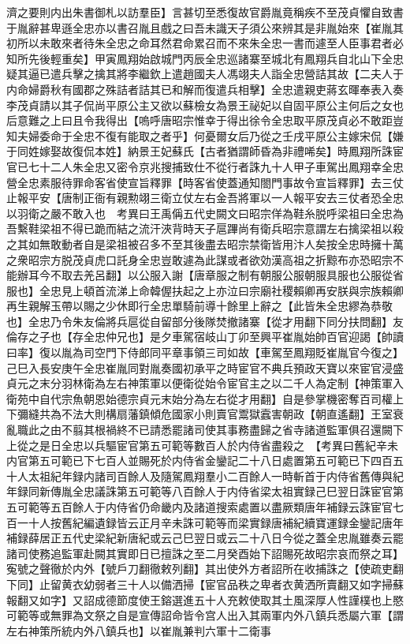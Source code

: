 濟之要則内出朱書御札以訪羣臣】言甚切至悉復故官爵胤竟稱疾不至茂貞懼自致書于胤辭甚卑遜全忠亦以書召胤且戲之曰吾未識天子須公來辨其是非胤始來【崔胤其初所以未敢來者待朱全忠之命耳然君命累召而不來朱全忠一書而遽至人臣事君者必知所先後輕重矣】甲寅鳳翔始啟城門丙辰全忠巡諸寨至城北有鳳翔兵自北山下全忠疑其逼已遣兵擊之擒其將李繼欽上遣趙國夫人馮翊夫人詣全忠營詰其故【二夫人于内命婦爵秋有國郡之殊詰者詰其已和解而復遣兵相擊】全忠遣親吏蔣玄暉奉表入奏李茂貞請以其子侃尚平原公主又欲以蘇檢女為景王祕妃以自固平原公主何后之女也后意難之上曰且令我得出【嗚呼唐昭宗惟幸于得出徐令全忠取平原茂貞必不敢距豈知夫婦委命于全忠不復有能取之者乎】何憂爾女后乃從之壬戌平原公主嫁宋侃【嫌于同姓嫁娶故復侃本姓】納景王妃蘇氏【古者猶謂師昏為非禮唏矣】時鳳翔所誅宦官已七十二人朱全忠又密令京兆搜捕致仕不從行者誅九十人甲子車駕出鳳翔幸全忠營全忠素服待罪命客省使宣旨釋罪【時客省使蓋通知閤門事故令宣旨釋罪】去三仗止報平安【唐制正衙有親勲翊三衛立仗左右金吾將軍以一人報平安去三仗者恐全忠以羽衛之嚴不敢入也　考異曰王禹偁五代史闕文曰昭宗佯為鞋糸脱呼梁祖曰全忠為吾繫鞋梁祖不得已跪而結之流汗浹背時天子扈蹕尚有衛兵昭宗意謂左右擒梁祖以殺之其如無敢動者自是梁祖被召多不至其後盡去昭宗禁衛皆用汴人矣按全忠時擁十萬之衆昭宗方脱茂貞虎口託身全忠豈敢遽為此謀或者欲効漢高祖之折黥布亦恐昭宗不能辦耳今不取去羌呂翻】以公服入謝【唐章服之制有朝服公服朝服具服也公服從省服也】全忠見上頓首流涕上命韓偓扶起之上亦泣曰宗廟社稷賴卿再安朕與宗族賴卿再生親解玉帶以賜之少休即行全忠單騎前導十餘里上辭之【此皆朱全忠繆為恭敬也】全忠乃令朱友倫將兵扈從自留部分後隊焚撤諸寨【從才用翻下同分扶問翻】友倫存之子也【存全忠仲兄也】是夕車駕宿岐山丁卯至興平崔胤始帥百官迎謁【帥讀曰率】復以胤為司空門下侍郎同平章事領三司如故【車駕至鳳翔貶崔胤官今復之】己巳入長安庚午全忠崔胤同對胤奏國初承平之時宦官不典兵預政天寶以來宦官浸盛貞元之末分羽林衛為左右神策軍以便衛從始令宦官主之以二千人為定制【神策軍入衛苑中自代宗魚朝恩始德宗貞元末始分為左右從才用翻】自是參掌機密奪百司權上下彌縫共為不法大則構扇藩鎮傾危國家小則賣官鬻獄蠧害朝政【朝直遙翻】王室衰亂職此之由不翦其根禍終不已請悉罷諸司使其事務盡歸之省寺諸道監軍俱召還闕下上從之是日全忠以兵驅宦官第五可範等數百人於内侍省盡殺之　【考異曰舊紀辛未内官第五可範已下七百人並賜死於内侍省金鑾記二十八日處置第五可範已下四百五十人太祖紀年録内諸司百餘人及隨駕鳳翔羣小二百餘人一時斬首于内侍省舊傳與紀年録同新傳胤全忠議誅第五可範等八百餘人于内侍省梁太祖實録己巳翌日誅宦官第五可範等五百餘人于内侍省仍命畿内及諸道搜索處置以盡厥類唐年補録云誅宦官七百一十人按舊紀編遺録皆云正月辛未誅可範等而梁實録唐補紀續寶運録金鑾記唐年補録薛居正五代史梁紀新唐紀或云己巳翌日或云二十八日今從之蓋全忠胤雖奏云罷諸司使務追監軍赴闕其實即日已擅誅之至二月癸酉始下詔賜死故昭宗哀而祭之耳】寃號之聲徹於内外【號戶刀翻徹敕列翻】其出使外方者詔所在收捕誅之【使疏吏翻下同】止留黄衣幼弱者三十人以備洒掃【宦官品秩之卑者衣黄洒所賣翻又如字掃蘇報翻又如字】又詔成德節度使王鎔選進五十人充敕使取其土風深厚人性謹樸也上愍可範等或無罪為文祭之自是宣傳詔命皆令宫人出入其兩軍内外八鎮兵悉屬六軍【謂左右神策所統内外八鎮兵也】以崔胤兼判六軍十二衛事

